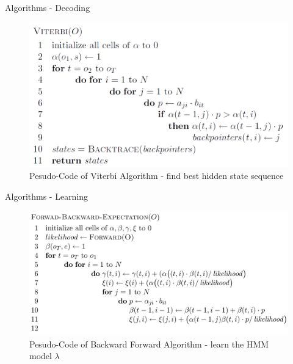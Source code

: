 \documentclass[11pt]{beamer}
\begin{document}
\begin{frame}{Algorithms - Decoding}
\begin{figure}[H]

\centering
\includegraphics[scale=0.35]{"vit"}
\caption{Pesudo-Code of Viterbi Algorithm - find best hidden state sequence \cite{cuhmm}}
\end{figure}
\end{frame}

\begin{frame}{Algorithms - Learning}
\begin{figure}[H]

\centering
\includegraphics[scale=0.3]{"BW"}
\caption{Pesudo-Code of Backward Forward Algorithm - learn the HMM model $\lambda$ \cite{cuhmm}}
\end{figure}
\end{frame}
\end{document}
